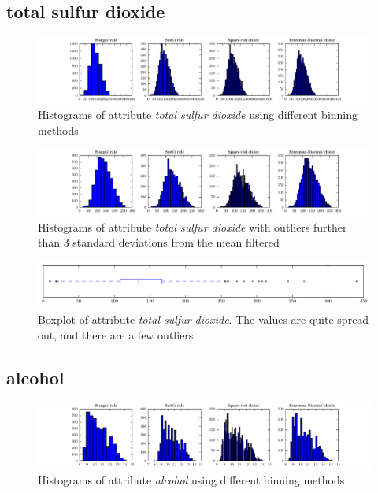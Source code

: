\documentclass{report}
\begin{document}
\newpage
\subsection{total sulfur dioxide}
\begin{figure}[H]
\includegraphics[width=\textwidth]{histograms/total_sulfur_dioxide.pdf}
\caption{Histograms of attribute \emph{total sulfur dioxide} using different binning methods}\end{figure}

\begin{figure}[H]
\includegraphics[width=\textwidth]{histograms/total_sulfur_dioxide_filtered.pdf}
\caption{Histograms of attribute \emph{total sulfur dioxide} with outliers further than 3 standard deviations from the mean filtered}
\end{figure}

\begin{figure}[H]
\includegraphics[width=\textwidth]{boxplots/total_sulfur_dioxide.pdf}
\caption{Boxplot of attribute \emph{total sulfur dioxide}. The values are quite spread out, and there are a few outliers.}\end{figure}

\newpage
\subsection{alcohol}
\begin{figure}[H]
\includegraphics[width=\textwidth]{histograms/alcohol.pdf}
\caption{Histograms of attribute \emph{alcohol} using different binning methods}\end{figure}
\end{document}
